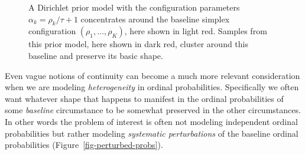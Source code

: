 \documentclass[
  letterpaper,
  DIV=11,
  numbers=noendperiod]{scrartcl}
\begin{document}
\begin{figure}


\caption{\label{fig-dirichlet}A Dirichlet prior model with the
configuration parameters \(\alpha_{k} = \rho_{k} / \tau + 1\)
concentrates around the baseline simplex configuration
\((\rho_{1}, \ldots, \rho_{K})\), here shown in light red. Samples from
this prior model, here shown in dark red, cluster around this baseline
and preserve its basic shape.}

\end{figure}%

Even vague notions of continuity can become a much more relevant
consideration when we are modeling \emph{heterogeneity} in ordinal
probabilities. Specifically we often want whatever shape that happens to
manifest in the ordinal probabilities of some \emph{baseline}
circumstance to be somewhat preserved in the other circumstances. In
other words the problem of interest is often not modeling independent
ordinal probabilities but rather modeling \emph{systematic
perturbations} of the baseline ordinal probabilities
(Figure~\ref{fig-perturbed-probs}).
\end{document}
